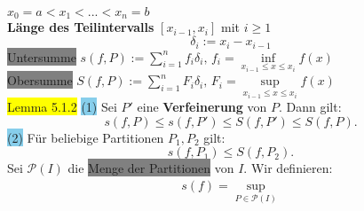 \documentclass[landscape, 10pt]{article}
\begin{document}
\begin{multicols}{3}
                     \textcolor{NavyBlue}{
                     $x_0=a<x_1<...<x_n=b$}\\
              \textbf{Länge des Teilintervalls} 
                     \textcolor{NavyBlue}{
                     $[x_{i-1},x_i]$} mit
                     \textcolor{NavyBlue}{
                     $i\geqslant1$}
                     \begin{equation*}
                            \delta_i:=x_i-x_{i-1}
                     \end{equation*}
              \colorbox{gray}{Untersumme} 
                     \textcolor{NavyBlue}{
                     $s(f,P):=\sum_{i=1}^nf_i\delta_i,\,
                     f_i=\inf\limits_{x_{i-1}
                     \leqslant x\leqslant x_i}f(x)$}\\ 
              \colorbox{gray}{Obersumme} 
                     \textcolor{NavyBlue}{$S(f,P)
                     :=\sum_{i=1}^nF_i\delta_i,\, 
                     F_i=\sup\limits_{x_{i-1}
                     \leqslant x\leqslant x_i}f(x)$}\\
              \colorbox{yellow}{Lemma 5.1.2} 
                     \colorbox{SkyBlue}{(1)} 
                            Sei \textcolor{NavyBlue}{$P'$}
                            eine \textbf{Verfeinerung} von 
                            \textcolor{NavyBlue}{$P$}. 
                            Dann gilt: 
                            \begin{equation*}
                                   s(f,P)\leqslant s(f,P')
                                   \leqslant S(f,P')
                                   \leqslant S(f,P).
                            \end{equation*}
                     \colorbox{SkyBlue}{(2)} 
                            Für beliebige Partitionen 
                            \textcolor{NavyBlue}{$P_1,P_2$}
                            gilt: 
                            \begin{equation*}
                                   s(f,P_1)
                                   \leqslant S(f,P_2).
                            \end{equation*}
              Sei \textcolor{NavyBlue}{$\mathcal{P}(I)$} 
                     die \colorbox{gray}{Menge der Partitionen} 
                     von \textcolor{NavyBlue}{$I$}. 
                     Wir definieren: 
                     \begin{align*}
                            s(f)=\sup
                            \limits_{P\in\mathcal{P}(I)}

\end{align*}
\end{multicols}
\end{document}
